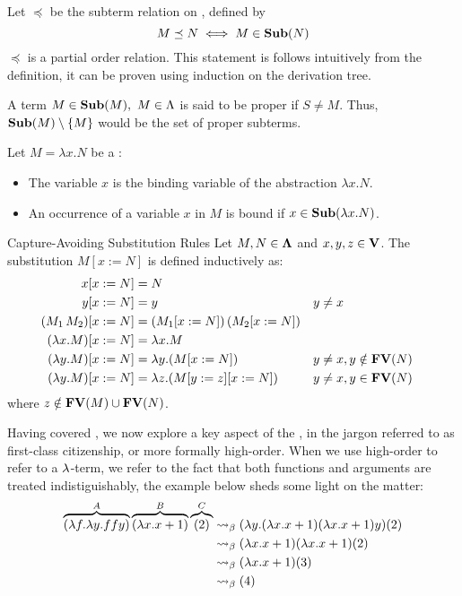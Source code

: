 \documentclass[12pt]{book}
\begin{document}
\begin{remark}
  Let \( \preceq \) be the subterm relation on \lterms, defined by
  \[
    M \preceq N \iff M \in \mathbf{Sub}( N )
  \]
  \( \preceq \) is a partial order relation. This statement is follows intuitively from the definition, it can be proven using induction on the derivation tree.
\end{remark}
\begin{definition} A term $M \in \mathbf{Sub}(M), \ M \in \Lambda$ is said to be proper if $S \neq M$. Thus, $\mathbf{Sub}(M) \setminus \{M\}$ would be the set of proper subterms.
\end{definition}
\begin{definition} Let \( M = \lambda x. N \) be a \lterm:
  \begin{itemize}
  \item The variable \( x \) is the binding variable of the abstraction \( \lambda x. N \).
  \item An occurrence of a variable \( x \) in \( M \) is bound if \( x \in \mathbf{Sub}( \lambda x. N ) \).
  \end{itemize}
\end{definition}

\begin{definition}Capture-Avoiding Substitution Rules
  Let \( M, N \in \mathbf{\Lambda} \) and \( x, y, z \in \mathbf{V} \). The substitution \( M[x := N] \) is defined inductively as:
  \[
    \begin{aligned}
      x[x := N]                       & = N \\
      y[x := N]                       & = y && y \neq x \\
      (M_1\, M_2)[x := N]             & = (M_1[x := N])\,(M_2[x := N]) \\
      (\lambda x. M)[x := N]          & = \lambda x. M \\
      (\lambda y. M)[x := N]          & = \lambda y. (M[x := N]) && y \neq x, y \notin \mathbf{FV}( N ) \\
      (\lambda y. M)[x := N]          & = \lambda z. (M[y := z][x := N]) && y \neq x, y \in \mathbf{FV}( N )
    \end{aligned}
  \]
  where \( z \notin \mathbf{FV}( M ) \cup \mathbf{FV}( N ) \).
\end{definition}


\newpage
Having covered \bred, we now explore a key aspect of the \lcalc, in the jargon referred to as first-class citizenship, or more formally high-order. When we use high-order to refer to a $\lambda$-term, we refer to the fact that both functions and arguments are treated indistiguishably, the example below sheds some light on the matter:
\begin{align*}
  \overbrace { (\lambda f . \lambda y . f f y) }^{A} \overbrace{ (\lambda x . x + 1) }^{B} \overbrace{(2)}^{C}
  &\mathrel{\leadsto}_\beta (\lambda y .(\lambda x . x + 1) (\lambda x . x + 1)y)(2) \\
  &\mathrel{\leadsto}_\beta (\lambda x . x + 1)(\lambda x . x + 1)(2) \\
  &\mathrel{\leadsto}_\beta (\lambda x . x + 1) (3) \\
  &\mathrel{\leadsto}_\beta (4)
\end{align*}
\end{document}
